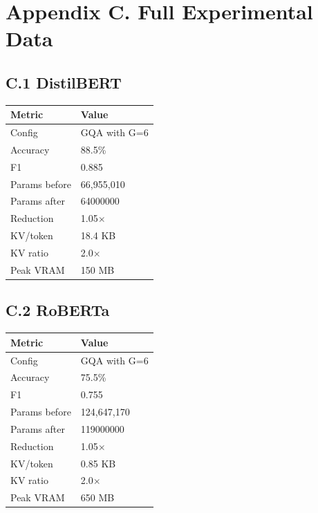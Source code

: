 
\section{Appendix C. Full Experimental Data}

\subsection{C.1 DistilBERT}

\begin{table}[H]
\centering
\small
\begin{tabular}{ll}
\toprule
\textbf{Metric} & \textbf{Value} \\
\midrule
Config & GQA with G=6 \\
Accuracy & 88.5\% \\
F1 & 0.885 \\
Params before & 66,955,010 \\
Params after & 64000000 \\
Reduction & 1.05$\times$ \\
KV/token & 18.4 KB \\
KV ratio & 2.0$\times$ \\
Peak VRAM & 150 MB \\
\bottomrule
\end{tabular}
\end{table}

\subsection{C.2 RoBERTa}

\begin{table}[H]
\centering
\small
\begin{tabular}{ll}
\toprule
\textbf{Metric} & \textbf{Value} \\
\midrule
Config & GQA with G=6 \\
Accuracy & 75.5\% \\
F1 & 0.755 \\
Params before & 124,647,170 \\
Params after & 119000000 \\
Reduction & 1.05$\times$ \\
KV/token & 0.85 KB \\
KV ratio & 2.0$\times$ \\
Peak VRAM & 650 MB \\
\bottomrule
\end{tabular}
\end{table}

